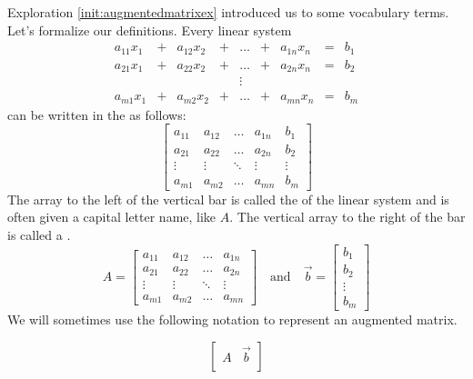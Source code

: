 \documentclass{ximera}
\begin{document}
Exploration \ref{init:augmentedmatrixex} introduced us to some vocabulary terms.  Let's formalize our definitions.  Every linear system 
$$\begin{array}{ccccccccc}
      a_{11}x_1 &+ &a_{12}x_2&+&\ldots&+&a_{1n}x_n&= &b_1 \\
	 a_{21}x_1 &+ &a_{22}x_2&+&\ldots&+&a_{2n}x_n&= &b_2 \\
     &&&&\vdots&&&& \\
     a_{m1}x_1 &+ &a_{m2}x_2&+&\ldots&+&a_{mn}x_n&= &b_m
    \end{array}$$
    can be written in the  as follows:
    $$\left[\begin{array}{cccc|c}  
 a_{11}&a_{12}&\ldots&a_{1n}&b_1\\a_{21}&a_{22}&\ldots&a_{2n}&b_2\\\vdots&\vdots&\ddots&\vdots&\vdots\\a_{m1}&a_{m2}&\ldots&a_{mn}&b_m
 \end{array}\right]$$
 The array to the left of the vertical bar is called the  of the linear system and is often given a capital letter name, like $A$.  The vertical array to the right of the bar is called a .
 $$A=\begin{bmatrix}a_{11}&a_{12}&\ldots&a_{1n}\\a_{21}&a_{22}&\ldots&a_{2n}\\\vdots&\vdots&\ddots&\vdots\\a_{m1}&a_{m2}&\ldots&a_{mn}\end{bmatrix}\quad\text{and}\quad\vec{b}=\begin{bmatrix}b_1\\b_2\\\vdots\\b_m\end{bmatrix}$$
We will sometimes use the following notation to represent an augmented matrix.

$$\left[\begin{array}{c|c}  
 A & \vec{b}\\
 \end{array}\right]$$
\end{document}
